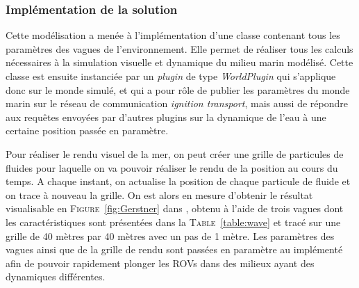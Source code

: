 			\subsubsection{Implémentation de la solution}

				Cette modélisation a menée à l'implémentation d'une classe contenant tous les paramètres des vagues de l'environnement. Elle permet de réaliser tous les calculs nécessaires à la simulation visuelle et dynamique du milieu marin modélisé. Cette classe est ensuite instanciée par un \textit{plugin} \gazebo{} de type \textit{WorldPlugin} qui s'applique donc sur le monde simulé, et qui a pour rôle de publier les paramètres du monde marin sur le réseau de communication \textit{ignition transport}, mais aussi de répondre aux requêtes envoyées par d'autres plugins sur la dynamique de l'eau à une certaine position passée en paramètre. 
				
				Pour réaliser le rendu visuel de la mer, on peut créer une grille de particules de fluides pour laquelle on va pouvoir réaliser le rendu de la position au cours du temps. A chaque instant, on actualise la position de chaque particule de fluide et on trace à nouveau la grille. On est alors en mesure d'obtenir le résultat visualisable en \textsc{Figure}~\ref{fig:Gerstner} dans \gazebo{}, obtenu à l'aide de trois vagues dont les caractéristiques sont présentées dans la \textsc{Table}~\ref{table:wave} et tracé sur une grille de 40 mètres par 40 mètres avec un pas de 1 mètre. Les paramètres des vagues ainsi que de la grille de rendu sont passées en paramètre au \plugin{} implémenté afin de pouvoir rapidement plonger les \gls{ROV}s dans des milieux ayant des dynamiques différentes.

